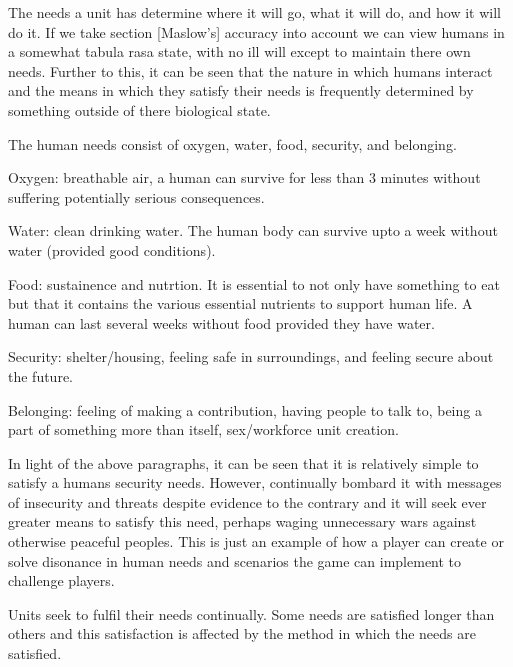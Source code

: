 The needs a unit has determine where it will go, what it will do, and how it will do it. If we take section [Maslow's] accuracy into account we can view humans in a somewhat tabula rasa state, with no ill will except to maintain there own needs. Further to this, it can be seen that the nature in which humans interact and the means in which they satisfy their needs is frequently determined by something outside of there biological state. 

The human needs consist of oxygen, water, food, security, and belonging.



Oxygen: breathable air, a human can survive for less than 3 minutes without suffering potentially serious consequences. 

Water: clean drinking water. The human body can survive upto a week without water (provided good conditions). 

Food: sustainence and nutrtion. It is essential to not only have something to eat but that it contains the various essential nutrients to support human life. A human can last several weeks without food provided they have water.

Security: shelter/housing, feeling safe in surroundings, and feeling secure about the future.

Belonging: feeling of making a contribution, having people to talk to, being a part of something more than itself, sex/workforce unit creation.



In light of the above paragraphs, it can be seen that it is relatively simple to satisfy a humans security needs. However, continually bombard it with messages of insecurity and threats despite evidence to the contrary and it will seek ever greater means to satisfy this need, perhaps waging unnecessary wars against otherwise peaceful peoples. This is just an example of how a player can create or solve disonance in human needs and scenarios the game can implement to challenge players.



Units seek to fulfil their needs continually. Some needs are satisfied longer than others and this satisfaction is affected by the method in which the needs are satisfied.

